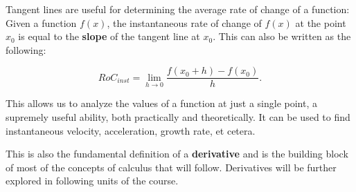 \documentclass[11pt]{article}
\begin{document}
Tangent lines are useful for determining the average rate of change of a function: 
Given a function $f(x)$, the instantaneous rate of change of $f(x)$ at the point $x_0$ is equal to the \textbf{slope} of the tangent line at $x_0$. This can also be written as the following: 

\begin{center}
\begin{equation*}
RoC_{inst} = \lim_{h \to 0} \frac{f(x_0+h)-f(x_0)}{h}. 
\end{equation*}
\end{center}

This allows us to analyze the values of a function at just a single point, a supremely useful ability, both practically and theoretically. It can be used to find instantaneous velocity, acceleration, growth rate, et cetera. 

This is also the fundamental definition of a \textbf{derivative} and is the building block of most of the concepts of calculus that will follow. Derivatives will be further explored in following units of the course.
\end{document}
